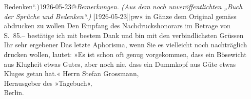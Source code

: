 \begin{ledgroupsized}[t]{13cm}
{                  Bedenken“.)1926-05-23@\strich\emph{Bemerkungen. (Aus dem noch unveröffentlichten „Buch der Sprüche und Bedenken“.)} {[}1926-05-23{]}|pw}« in Gänze dem Original gemäss abdrucken zu
               wollen\pend
           \pstart
           Den Empfang des Nachdruckshonorars im Betrage von S. 85.– bestätige ich mit bestem
               Dank und bin mit den verbindlichsten Grüssen\pend
           \pstart Ihr sehr ergebener\pend{}{\bigskip}\pstart
           \noindent{}Das letzte Aphorisma, wenn Sie es vielleicht noch nachträglich drucken wollen,
                  lautet:\pend
           \pstart
           »Es ist schon oft genug vorgekommen, dass ein Bösewicht aus Klugheit etwas Gutes,
                  aber noch nie, dass ein Dummkopf aus Güte etwas Kluges getan hat.«\pend
           {\bigskip}\pstart
           \noindent{}Herrn Stefan Grossmann,{\\}Herausgeber des »Tagebuch«,{\\}Berlin.\pend
           
         
         \endnumbering{}\end{ledgroupsized}  \newcommand{\dateiname}{L02476}\newcommand{\titel}{Arthur Schnitzler an Stefan Großmann, 31. 5. 1926}\newcommand{\editorInnen}{Martin Anton Müller und Gerd-Hermann Susen}
      
